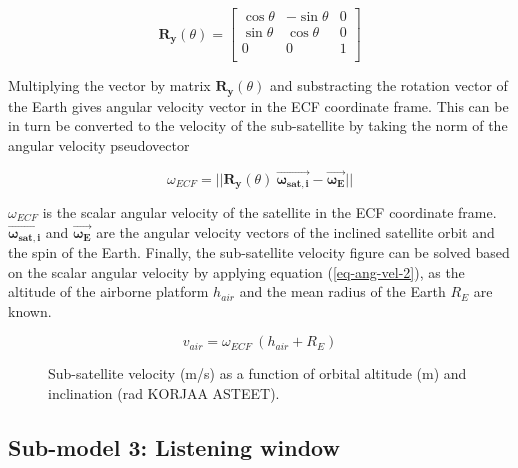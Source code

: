 \documentclass[english, 12pt, a4paper, elec, utf8, a-1b, online]{aaltothesis}
\begin{document}
\begin{equation*}
  \bm{R_y}(\theta) = \begin{bmatrix}
    \cos \theta & -\sin \theta & 0 \\[3pt]
    \sin \theta &  \cos \theta & 0 \\[3pt]
    0           &  0           & 1 \\
    \end{bmatrix}
\end{equation*}

Multiplying the vector by matrix $\bm{R_y}(\theta)$ and substracting the rotation vector of the Earth gives angular velocity vector in the ECF coordinate frame.
This can be in turn be converted to the velocity of the sub-satellite by taking the norm of the angular velocity pseudovector

\begin{equation*}
  \omega_{ECF} =
  ||\bm{R_y}(\theta)\ \bm{\vec{\omega_{sat, i}}} - \bm{\vec{\omega_{E}}}||
\end{equation*}

$\omega_{ECF}$ is the scalar angular velocity of the satellite in the ECF coordinate frame.
$\bm{\vec{\omega_{sat, i}}}$ and $\bm{\vec{\omega_{E}}}$ are the angular velocity vectors of the inclined satellite orbit and the spin of the Earth.
Finally, the sub-satellite velocity figure can be solved based on the scalar angular velocity by applying equation (\ref{eq-ang-vel-2}), as the altitude of the airborne platform $h_{air}$ and the mean radius of the Earth $R_E$ are known.

\begin{equation}
  v_{air} = \omega_{ECF}\ (h_{air} + R_E)
\end{equation}

\begin{figure}[h]
  \centering
  
  \caption{Sub-satellite velocity (m/s) as a function of orbital altitude (m) and inclination (rad KORJAA ASTEET).} %
  \label{fig-subsat-velocity-inclined}
\end{figure}

\subsection{Sub-model 3: Listening window}
\end{document}
